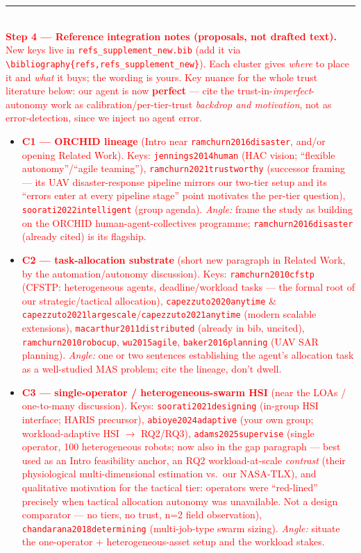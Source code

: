 \documentclass[10pt]{article}
\theoremstyle{definition}
\begin{document}
\textcolor{red}{\rule{\linewidth}{0.6pt}}\\
\textcolor{red}{\textbf{Step 4 --- Reference integration notes (proposals, not drafted text).} New keys live in \texttt{refs\_supplement\_new.bib} (add it via \texttt{\textbackslash bibliography\{refs,refs\_supplement\_new\}}). Each cluster gives \emph{where} to place it and \emph{what} it buys; the wording is yours. Key nuance for the whole trust literature below: our agent is now \textbf{perfect} --- cite the trust-in-\emph{imperfect}-autonomy work as calibration/per-tier-trust \emph{backdrop and motivation}, not as error-detection, since we inject no agent error.}
\begin{itemize}\itemsep2pt
  \item \textcolor{red}{\textbf{C1 --- ORCHID lineage} (Intro near \texttt{ramchurn2016disaster}, and/or opening Related Work). Keys: \texttt{jennings2014human} (HAC vision; ``flexible autonomy''/``agile teaming''), \texttt{ramchurn2021trustworthy} (successor framing --- its UAV disaster-response pipeline mirrors our two-tier setup and its ``errors enter at every pipeline stage'' point motivates the per-tier question), \texttt{soorati2022intelligent} (group agenda). \emph{Angle:} frame the study as building on the ORCHID human-agent-collectives programme; \texttt{ramchurn2016disaster} (already cited) is its flagship.}
  \item \textcolor{red}{\textbf{C2 --- task-allocation substrate} (short new paragraph in Related Work, by the automation/autonomy discussion). Keys: \texttt{ramchurn2010cfstp} (CFSTP: heterogeneous agents, deadline/workload tasks --- the formal root of our strategic/tactical allocation), \texttt{capezzuto2020anytime} \& \texttt{capezzuto2021largescale}/\texttt{capezzuto2021anytime} (modern scalable extensions), \texttt{macarthur2011distributed} (already in bib, uncited), \texttt{ramchurn2010robocup}, \texttt{wu2015agile}, \texttt{baker2016planning} (UAV SAR planning). \emph{Angle:} one or two sentences establishing the agent's allocation task as a well-studied MAS problem; cite the lineage, don't dwell.}
  \item \textcolor{red}{\textbf{C3 --- single-operator / heterogeneous-swarm HSI} (near the LOAs / one-to-many discussion). Keys: \texttt{soorati2021designing} (in-group HSI interface; HARIS precursor), \texttt{abioye2024adaptive} (your own group; workload-adaptive HSI $\to$ RQ2/RQ3), \texttt{adams2025supervise} (single operator, 100 heterogeneous robots; now also in the gap paragraph --- best used as an Intro feasibility anchor, an RQ2 workload-at-scale \emph{contrast} (their physiological multi-dimensional estimation vs.\ our NASA-TLX), and qualitative motivation for the tactical tier: operators were ``red-lined'' precisely when tactical allocation autonomy was unavailable. Not a design comparator --- no tiers, no trust, n=2 field observation), \texttt{chandarana2018determining} (multi-job-type swarm sizing). \emph{Angle:} situate the one-operator + heterogeneous-asset setup and the workload stakes.}

\end{itemize}
\end{document}
